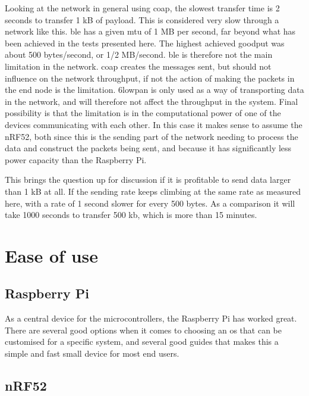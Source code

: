 \noindent Looking at the network in general using \gls{coap}, the slowest transfer time is 2 seconds to transfer 1 kB of \gls{payload}. This is considered very slow through a network like this. \gls{ble} has a given \gls{mtu} of 1 MB per second, far beyond what has been achieved in the tests presented here. The highest achieved \gls{goodput} was about 500 bytes/second, or 1/2 MB/second. \gls{ble} is therefore not the main limitation in the network. \gls{coap} creates the messages sent, but should not influence on the network throughput, if not the action of making the packets in the end node is the limitation. \gls{6lowpan} is only used as a way of transporting data in the network, and will therefore not affect the throughput in the system. Final possibility is that the limitation is in the computational power of one of the devices communicating with each other. In this case it makes sense to assume the \gls{nRF52}, both since this is the sending part of the network needing to process the data and construct the packets being sent, and because it has significantly less power capacity than the \gls{Raspberry Pi}.

\noindent This brings the question up for discussion if it is profitable to send data larger than 1 kB at all. If the sending rate keeps climbing at the same rate as measured here, with a rate of 1 second slower for every 500 bytes. As a comparison it will take 1000 seconds to transfer 500 kb, which is more than 15 minutes. 


\section{Ease of use}


\subsection{Raspberry Pi}

\noindent As a central device for the \glspl{microcontroller}, the \gls{Raspberry Pi} has worked great. There are several good options when it comes to choosing an \gls{os} that can be customised for a specific system, and several good guides that makes this a simple and fast small device for most end users. 


\subsection{nRF52}

